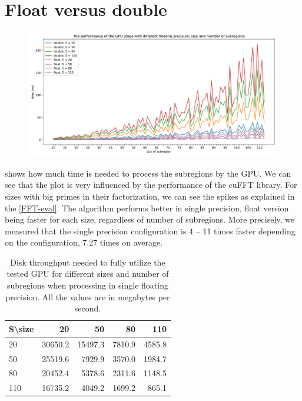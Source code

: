 \section{Float versus double}

\begin{figure}
	\centering
	\includegraphics[width=\textwidth]{img/eval/float-double-compare}
	\caption{}
	\label{float-double-compare}
\end{figure}



 shows how much time is needed to process the subregions by the GPU. We can see that the plot is very influenced by the performance of the cuFFT library. For sizes with big primes in their factorization, we can see the spikes as explained in the \cref{FFT-eval}. The algorithm performs better in single precision, float version being faster for each size, regardless of number of subregions. More precisely, we measured that the single precision configuration is 4 -- 11 times faster depending on the configuration, 7.27 times on average.

\begin{table}[]
	\centering
	\begin{tabular}{@{}l|rrrr@{}}
		S\textbackslash size &      20 &      50 &     80 &    110  \\ \midrule
		20                   & 30650.2 & 15497.3 & 7810.9 & 4585.8  \\
		50                   & 25519.6 &  7929.9 & 3570.0 & 1984.7  \\
		80                   & 20452.4 &  5378.6 & 2311.6 & 1148.5  \\
		110                  & 16735.2 &  4049.2 & 1699.2 &  865.1 
	\end{tabular}
	\caption{Disk throughput needed to fully utilize the tested GPU for different sizes and number of subregions when processing in single floating precision. All the values are in megabytes per second.}
	\label{necessary-disk-throughput-float}
\end{table}

